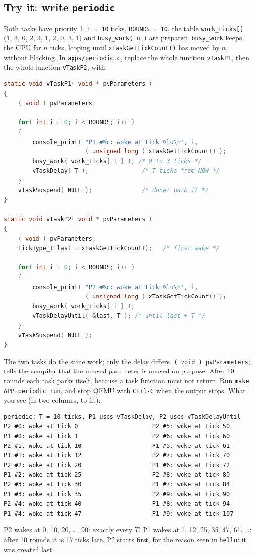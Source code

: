 \subsection{Try it: write \texttt{periodic}}
Both tasks have priority 1. \texttt{T = 10} ticks, \texttt{ROUNDS = 10}, the table \texttt{work\_ticks[]} (1, 3, 0, 2, 3, 1, 2, 0, 3, 1) and \texttt{busy\_work( n )} are prepared: \texttt{busy\_work} keeps the CPU for $n$ ticks, looping until \texttt{xTaskGetTickCount()} has moved by $n$, without blocking. In \texttt{apps/periodic.c}, replace the whole function \texttt{vTaskP1}, then the whole function \texttt{vTaskP2}, with:
\begin{lstlisting}[language=C, showstringspaces=false, basicstyle=\ttfamily\scriptsize]
static void vTaskP1( void * pvParameters )
{
    ( void ) pvParameters;

    for( int i = 0; i < ROUNDS; i++ )
    {
        console_print( "P1 #%d: woke at tick %lu\n", i,
                       ( unsigned long ) xTaskGetTickCount() );
        busy_work( work_ticks[ i ] ); /* 0 to 3 ticks */
        vTaskDelay( T );               /* T ticks from NOW */
    }
    vTaskSuspend( NULL );              /* done: park it */
}

static void vTaskP2( void * pvParameters )
{
    ( void ) pvParameters;
    TickType_t last = xTaskGetTickCount();   /* first wake */

    for( int i = 0; i < ROUNDS; i++ )
    {
        console_print( "P2 #%d: woke at tick %lu\n", i,
                       ( unsigned long ) xTaskGetTickCount() );
        busy_work( work_ticks[ i ] );
        vTaskDelayUntil( &last, T ); /* until last + T */
    }
    vTaskSuspend( NULL );
}
\end{lstlisting}
The two tasks do the same work; only the delay differs. \texttt{( void ) pvParameters;} tells the compiler that the unused parameter is unused on purpose. After 10 rounds each task parks itself, because a task function must not return. Run \texttt{make APP=periodic run}, and stop QEMU with \texttt{Ctrl-C} when the output stops. What you see (in two columns, to fit):
{\verbatimscriptsize
\begin{verbatim}
periodic: T = 10 ticks, P1 uses vTaskDelay, P2 uses vTaskDelayUntil
P2 #0: woke at tick 0                     P2 #5: woke at tick 50
P1 #0: woke at tick 1                     P2 #6: woke at tick 60
P2 #1: woke at tick 10                    P1 #5: woke at tick 61
P1 #1: woke at tick 12                    P2 #7: woke at tick 70
P2 #2: woke at tick 20                    P1 #6: woke at tick 72
P1 #2: woke at tick 25                    P2 #8: woke at tick 80
P2 #3: woke at tick 30                    P1 #7: woke at tick 84
P1 #3: woke at tick 35                    P2 #9: woke at tick 90
P2 #4: woke at tick 40                    P1 #8: woke at tick 94
P1 #4: woke at tick 47                    P1 #9: woke at tick 107
\end{verbatim}}
P2 wakes at 0, 10, 20, \dots, 90: exactly every $T$. P1 wakes at 1, 12, 25, 35, 47, 61, \dots: after 10 rounds it is 17 ticks late. P2 starts first, for the reason seen in \texttt{hello}: it was created last.


